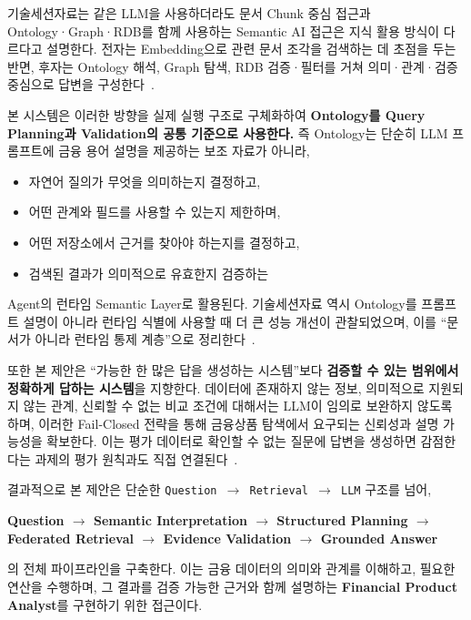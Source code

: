 \documentclass[11pt,a4paper]{article}
\begin{document}
기술세션자료는 같은 LLM을 사용하더라도
문서 Chunk 중심 접근과 Ontology·Graph·RDB를 함께 사용하는 Semantic AI 접근은
지식 활용 방식이 다르다고 설명한다.
전자는 Embedding으로 관련 문서 조각을 검색하는 데 초점을 두는 반면,
후자는 Ontology 해석, Graph 탐색, RDB 검증·필터를 거쳐
의미·관계·검증 중심으로 답변을 구성한다~\cite[16쪽]{mirae-tech}.

본 시스템은 이러한 방향을 실제 실행 구조로 구체화하여
\textbf{Ontology를 Query Planning과 Validation의 공통 기준으로 사용한다.}
즉 Ontology는 단순히 LLM 프롬프트에 금융 용어 설명을 제공하는 보조 자료가 아니라,

\begin{itemize}
\item 자연어 질의가 무엇을 의미하는지 결정하고,
\item 어떤 관계와 필드를 사용할 수 있는지 제한하며,
\item 어떤 저장소에서 근거를 찾아야 하는지를 결정하고,
\item 검색된 결과가 의미적으로 유효한지 검증하는
\end{itemize}

Agent의 런타임 Semantic Layer로 활용된다.
기술세션자료 역시 Ontology를 프롬프트 설명이 아니라
런타임 식별에 사용할 때 더 큰 성능 개선이 관찰되었으며,
이를 ``문서가 아니라 런타임 통제 계층''으로 정리한다~\cite[23쪽]{mirae-tech}.

또한 본 제안은 ``가능한 한 많은 답을 생성하는 시스템''보다
\textbf{검증할 수 있는 범위에서 정확하게 답하는 시스템}을 지향한다.
데이터에 존재하지 않는 정보, 의미적으로 지원되지 않는 관계,
신뢰할 수 없는 비교 조건에 대해서는 LLM이 임의로 보완하지 않도록 하며,
이러한 Fail-Closed 전략을 통해 금융상품 탐색에서 요구되는 신뢰성과 설명 가능성을 확보한다.
이는 평가 데이터로 확인할 수 없는 질문에 답변을 생성하면 감점한다는
과제의 평가 원칙과도 직접 연결된다~\cite[7쪽]{mirae-task}.

결과적으로 본 제안은 단순한
\texttt{Question $\rightarrow$ Retrieval $\rightarrow$ LLM}
구조를 넘어,

\begin{center}
\textbf{Question $\rightarrow$ Semantic Interpretation $\rightarrow$ Structured Planning
$\rightarrow$ Federated Retrieval $\rightarrow$ Evidence Validation $\rightarrow$ Grounded Answer}
\end{center}

의 전체 파이프라인을 구축한다.
이는 금융 데이터의 의미와 관계를 이해하고,
필요한 연산을 수행하며,
그 결과를 검증 가능한 근거와 함께 설명하는
\textbf{Financial Product Analyst}를 구현하기 위한 접근이다.
\end{document}

